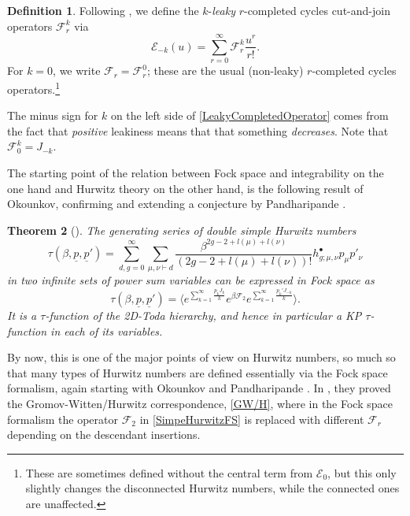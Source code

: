 \documentclass[10pt,a4paper,oneside,no-math,reqno]{amsart}%
\theoremstyle{plain}
\newtheorem{theorem}{Theorem}[section]
\theoremstyle{definition}
\newtheorem{definition}[theorem]{Definition}
\theoremstyle{remark}
\numberwithin{equation}{section}
\newcommand{\mc}[1]{\mathcal{#1}}
\newcommand{\1}{\mathds{1}}
\newcommand{\<}{\langle}
\renewcommand{\>}{\rangle}
\begin{document}
\begin{definition}
    Following \cite{AKL25}, we define the $k$-\emph{leaky} $r$-completed cycles cut-and-join operators $\mathcal{F}_r^k$ via
    \begin{equation}\label{LeakyCompletedOperator}
        \mathcal{E}_{-k} (u)
        =
        \sum_{r=0}^\infty\mathcal{F}^k_r\frac{u^r}{r!}.
    \end{equation}
    For $k = 0$, we write $ \mc{F}_r = \mc{F}_r^0$; these are the usual (non-leaky) $r$-completed cycles operators.\footnote{These are sometimes defined without the central term from $ \mc{E}_0$, but this only slightly changes the disconnected Hurwitz numbers, while the connected ones are unaffected.}
\end{definition}

The minus sign for $k $ on the left side of \cref{LeakyCompletedOperator} comes from the fact that \emph{positive} leakiness means that that something \emph{decreases}. 
Note that $ \mc{F}_0^k = J_{-k}$.

The starting point of the relation between Fock space and integrability on the one hand and Hurwitz theory on the other hand, is the following result of Okounkov, confirming and extending a conjecture by Pandharipande \cite{Pan00}.

\begin{theorem}[{\cite{Ok00}}]
    The generating series of double simple Hurwitz numbers
    \begin{equation}
        \tau ( \beta, \underline{p}, \underline{p}')
        =
        \sum_{d, g = 0}^\infty \sum_{\mu, \nu \vdash d} \frac{\beta^{2g-2+ l(\mu) + l (\nu) }}{(2g-2+l(\mu) + l(\nu))!} h^\bullet_{g;\mu, \nu} p_{\mu} p'_\nu
    \end{equation}
    in two infinite sets of power sum variables can be expressed in Fock space as
    \begin{equation}\label{SimpeHurwitzFS}
        \tau ( \beta, \underline{p}, \underline{p}')
        =
        \Big\< e^{\sum_{k=1}^\infty \frac{p_k J_k}{k}} e^{\beta \mc{F}_2} e^{\sum_{k=1}^\infty \frac{p_k' J_{-k}}{k}}\Big\> .
    \end{equation}
    It is a $\tau$-function of the 2D-Toda hierarchy, and hence in particular a KP $\tau$-function in each of its variables.
\end{theorem}

By now, this is one of the major points of view on Hurwitz numbers, so much so that many types of Hurwitz numbers are defined essentially via the Fock space formalism, again starting with Okounkov and Pandharipande \cite{OP06a}. In  \cite{OP06}, they proved the Gromov-Witten/Hurwitz correspondence, \cref{GW/H}, where in the Fock space formalism the operator $ \mc{F}_2$ in \cref{SimpeHurwitzFS} is replaced with different $ \mc{F}_r$ depending on the descendant insertions.
\end{document}
